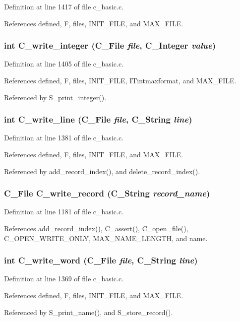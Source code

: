 Definition at line 1417 of file c\_\-basic.c.

References defined, F, files, INIT\_\-FILE, and MAX\_\-FILE.
\subsubsection{\setlength{\rightskip}{0pt plus 5cm}int C\_\-write\_\-integer (\bf{C\_\-File} {\em file}, \bf{C\_\-Integer} {\em value})}\label{c__basic_8h_801469b46559cac4fbfd5e04c4afb89d}




Definition at line 1405 of file c\_\-basic.c.

References defined, F, files, INIT\_\-FILE, ITintmaxformat, and MAX\_\-FILE.

Referenced by S\_\-print\_\-integer().
\subsubsection{\setlength{\rightskip}{0pt plus 5cm}int C\_\-write\_\-line (\bf{C\_\-File} {\em file}, \bf{C\_\-String} {\em line})}\label{c__basic_8h_8e35c0d48b79b341af2f7465403b5709}




Definition at line 1381 of file c\_\-basic.c.

References defined, F, files, INIT\_\-FILE, and MAX\_\-FILE.

Referenced by add\_\-record\_\-index(), and delete\_\-record\_\-index().
\subsubsection{\setlength{\rightskip}{0pt plus 5cm}\bf{C\_\-File} C\_\-write\_\-record (\bf{C\_\-String} {\em record\_\-name})}\label{c__basic_8h_2d6b8c0ebb2ee61a31d8a7f84ca0dc4f}




Definition at line 1181 of file c\_\-basic.c.

References add\_\-record\_\-index(), C\_\-assert(), C\_\-open\_\-file(), C\_\-OPEN\_\-WRITE\_\-ONLY, MAX\_\-NAME\_\-LENGTH, and name.
\subsubsection{\setlength{\rightskip}{0pt plus 5cm}int C\_\-write\_\-word (\bf{C\_\-File} {\em file}, \bf{C\_\-String} {\em line})}\label{c__basic_8h_dd369e05981241eb4e9e6f74b422a802}




Definition at line 1369 of file c\_\-basic.c.

References defined, F, files, INIT\_\-FILE, and MAX\_\-FILE.

Referenced by S\_\-print\_\-name(), and S\_\-store\_\-record().